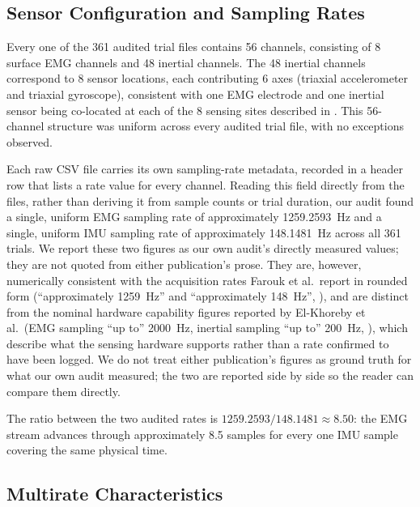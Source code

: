 \documentclass[conference]{IEEEtran}
\begin{document}
\subsection{Sensor Configuration and Sampling Rates}

Every one of the 361 audited trial files contains 56 channels,
consisting of 8 surface EMG channels and 48 inertial channels. The
48 inertial channels correspond to 8 sensor locations, each
contributing 6 axes (triaxial accelerometer and triaxial
gyroscope), consistent with one EMG electrode and one inertial
sensor being co-located at each of the 8 sensing sites described in
\cite{el-khoreby2025sdalle}. This 56-channel structure was uniform
across every audited trial file, with no exceptions observed.

Each raw CSV file carries its own sampling-rate metadata, recorded
in a header row that lists a rate value for every channel. Reading
this field directly from the files, rather than deriving it from
sample counts or trial duration, our audit found a single, uniform
EMG sampling rate of approximately 1259.2593~Hz and a single,
uniform IMU sampling rate of approximately 148.1481~Hz across all
361 trials. We report these two figures as our own audit's directly
measured values; they are not quoted from either publication's
prose. They are, however, numerically consistent with the
acquisition rates Farouk et al.\ report in rounded form
(``approximately 1259~Hz'' and ``approximately 148~Hz'',
\cite{farouk2026sdalle}), and are distinct from the nominal hardware
capability figures reported by El-Khoreby et al.\ (EMG sampling
``up to'' 2000~Hz, inertial sampling ``up to'' 200~Hz,
\cite{el-khoreby2025sdalle}), which describe what the sensing
hardware supports rather than a rate confirmed to have been logged.
We do not treat either publication's figures as ground truth for
what our own audit measured; the two are reported side by side so
the reader can compare them directly.

The ratio between the two audited rates is
$1259.2593 / 148.1481 \approx 8.50$: the EMG stream advances through
approximately 8.5 samples for every one IMU sample covering the same
physical time.

\subsection{Multirate Characteristics}
\end{document}
